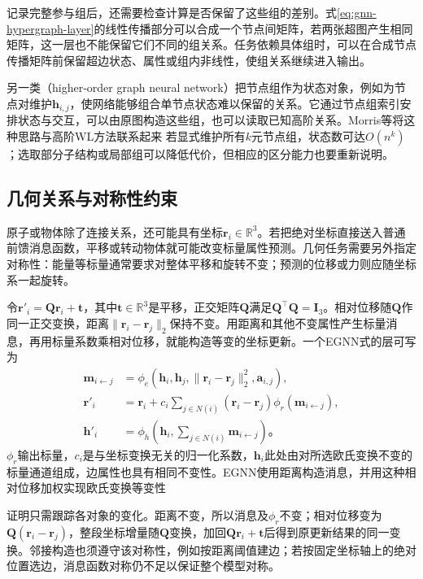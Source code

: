 记录完整参与组后，还需要检查计算是否保留了这些组的差别。式\eqref{eq:gnn-hypergraph-layer}的线性传播部分可以合成一个节点间矩阵，若两张超图产生相同矩阵，这一层也不能保留它们不同的组关系。任务依赖具体组时，可以在合成节点传播矩阵前保留超边状态、属性或组内非线性，使组关系继续进入输出。

另一类（higher-order graph neural network）把节点组作为状态对象，例如为节点对维护$\bm{h}_{i,j}$，使网络能够组合单节点状态难以保留的关系。它通过节点组索引安排状态与交互，可以由原图构造这些组，也可以读取已知高阶关系。Morris等将这种思路与高阶WL方法联系起来 若显式维护所有$k$元节点组，状态数可达$O(n^k)$；选取部分子结构或局部组可以降低代价，但相应的区分能力也要重新说明。

\subsection{几何关系与对称性约束}
\label{sec:gnn-geometric}

原子或物体除了连接关系，还可能具有坐标$\bm{r}_i\in\mathbb{R}^{3}$。若把绝对坐标直接送入普通前馈消息函数，平移或转动物体就可能改变标量属性预测。几何任务需要另外指定对称性：能量等标量通常要求对整体平移和旋转不变；预测的位移或力则应随坐标系一起旋转。

令$\bm{r}'_i=\bm{Q}\bm{r}_i+\bm{t}$，其中$\bm{t}\in\mathbb{R}^{3}$是平移，正交矩阵$\bm{Q}$满足$\bm{Q}^{\top}\bm{Q}=\bm{I}_3$。相对位移随$\bm{Q}$作同一正交变换，距离$\lVert\bm{r}_i-\bm{r}_j\rVert_2$保持不变。用距离和其他不变属性产生标量消息，再用标量系数乘相对位移，就能构造等变的坐标更新。一个EGNN式的层可写为
\begin{equation}
  \begin{aligned}
    \bm{m}_{i\leftarrow j}
      &=\phi_e(\bm{h}_i,\bm{h}_j,
        \lVert\bm{r}_i-\bm{r}_j\rVert_2^2,\bm{a}_{i,j}),\\
    \bm{r}'_i&=\bm{r}_i+
      c_i\sum_{j\in N(i)}(\bm{r}_i-\bm{r}_j)\phi_r(\bm{m}_{i\leftarrow j}),\\
    \bm{h}'_i&=\phi_h\!\left(\bm{h}_i,\sum_{j\in N(i)}\bm{m}_{i\leftarrow j}\right)\text{。}
  \end{aligned}
  \label{eq:gnn-egnn}
\end{equation}
$\phi_r$输出标量，$c_i$是与坐标变换无关的归一化系数，$\bm{h}_i$此处由对所选欧氏变换不变的标量通道组成，边属性也具有相同不变性。EGNN使用距离构造消息，并用这种相对位移加权实现欧氏变换等变性

证明只需跟踪各对象的变化。距离不变，所以消息及$\phi_r$不变；相对位移变为$\bm{Q}(\bm{r}_i-\bm{r}_j)$，整段坐标增量随$\bm{Q}$变换，加回$\bm{Q}\bm{r}_i+\bm{t}$后得到原更新结果的同一变换。邻接构造也须遵守该对称性，例如按距离阈值建边；若按固定坐标轴上的绝对位置选边，消息函数对称仍不足以保证整个模型对称。


